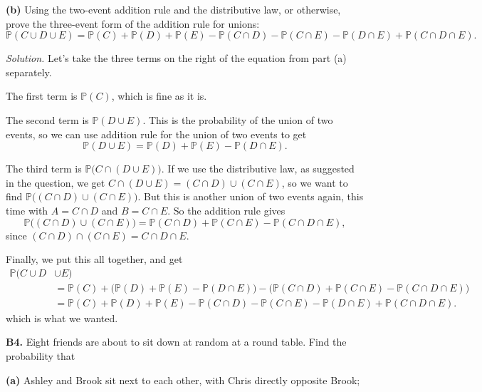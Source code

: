 \documentclass[
  a4paper,
]{book}
\theoremstyle{definition}
\theoremstyle{definition}
\theoremstyle{definition}
\theoremstyle{definition}
\theoremstyle{remark}
\begin{document}
\textbf{(b)} Using the two-event addition rule and the distributive law, or otherwise, prove the three-event form of the addition rule for unions:
\[
  \mathbb P(C \cup D \cup E) = \mathbb P(C) + \mathbb P(D) + \mathbb P(E) 
  - \mathbb P(C \cap D) - \mathbb P(C \cap E) - \mathbb P(D \cap E) + \mathbb P(C \cap D \cap E) .
\]

\begin{myanswers}
\emph{Solution.}
Let's take the three terms on the right of the equation from part (a) separately.

The first term is \(\mathbb P(C)\), which is fine as it is.

The second term is \(\mathbb P(D \cup E)\). This is the probability of the union of two events, so we can use addition rule for the union of two events to get
\[ \mathbb P(D \cup E) = \mathbb P(D) + \mathbb P(E) - \mathbb P(D \cap E) . \]

The third term is \(\mathbb P\big(C \cap (D \cup E)\big)\). If we use the distributive law, as suggested in the question, we get \(C \cap (D \cup E) = (C \cap D) \cup (C\cap E)\), so we want to find \(\mathbb P\big((C \cap D) \cup (C\cap E)\big)\). But this is another union of two events again, this time with \(A = C \cap D\) and \(B = C \cap E\). So the addition rule gives
\[ \mathbb P\big((C \cap D) \cup (C\cap E)\big) = \mathbb P(C \cap D) + \mathbb P(C \cap E) - \mathbb P(C \cap D \cap E) , \]
since \((C \cap D) \cap (C \cap E) = C \cap D \cap E\).

Finally, we put this all together, and get
\begin{align*}
  \mathbb P(C \cup D &\cup E) \\
  &= \mathbb P(C) + \big(\mathbb P(D) + \mathbb P(E) - \mathbb P(D \cap E)\big) - \big(\mathbb P(C \cap D) + \mathbb P(C \cap E) - \mathbb P(C \cap D \cap E)\big) \\
  &= \mathbb P(C) + \mathbb P(D) + \mathbb P(E) - \mathbb P(C \cap D) - \mathbb P(C \cap E) - \mathbb P(D \cap E) + \mathbb P(C \cap D \cap E) . 
\end{align*}
which is what we wanted.

\end{myanswers}

\textbf{B4.} Eight friends are about to sit down at random at a round table. Find the probability that

\textbf{(a)} Ashley and Brook sit next to each other, with Chris directly opposite Brook;
\end{document}
